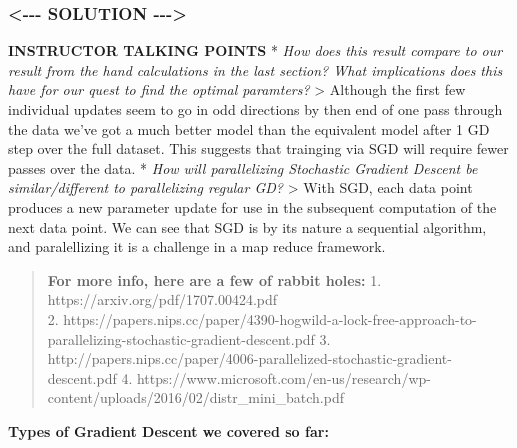 \documentclass[11pt]{article}
\begin{document}
    \subsubsection{\textless{}-\/-\/- SOLUTION
-\/-\/-\textgreater{}}\label{solution----}

\textbf{INSTRUCTOR TALKING POINTS} * \emph{How does this result compare
to our result from the hand calculations in the last section? What
implications does this have for our quest to find the optimal
paramters?} \textgreater{} Although the first few individual updates
seem to go in odd directions by then end of one pass through the data
we've got a much better model than the equivalent model after 1 GD step
over the full dataset. This suggests that trainging via SGD will require
fewer passes over the data. * \emph{How will parallelizing Stochastic
Gradient Descent be similar/different to parallelizing regular GD?}
\textgreater{} With SGD, each data point produces a new parameter update
for use in the subsequent computation of the next data point. We can see
that SGD is by its nature a sequential algorithm, and paralellizing it
is a challenge in a map reduce framework.

\begin{quote}
\textbf{For more info, here are a few of rabbit holes:} 1.
https://arxiv.org/pdf/1707.00424.pdf\\
2.
https://papers.nips.cc/paper/4390-hogwild-a-lock-free-approach-to-parallelizing-stochastic-gradient-descent.pdf
3.
http://papers.nips.cc/paper/4006-parallelized-stochastic-gradient-descent.pdf
4.
https://www.microsoft.com/en-us/research/wp-content/uploads/2016/02/distr\_mini\_batch.pdf
\end{quote}

    \textbf{Types of Gradient Descent we covered so far:}
\end{document}

